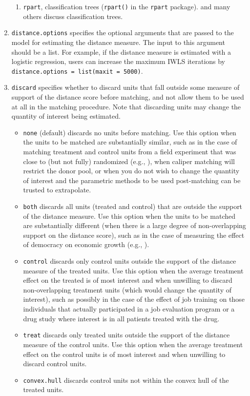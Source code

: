 \documentclass[oneside,letterpaper,titlepage]{article}
\begin{document}
\begin{enumerate}
\begin{enumerate}
  \item \texttt{rpart}, classification trees ({\tt rpart()} in the
    \texttt{rpart} package). \citet{BreFriOls84,RugKimMar03} and many
    others discuss classification trees.
  \end{enumerate}
  
\item \texttt{distance.options} specifies the optional arguments that
  are passed to the model for estimating the distance measure. The
  input to this argument should be a list.  For example, if the
  distance measure is estimated with a logistic regression, users can
  increase the maximum IWLS iterations by \texttt{distance.options =
    list(maxit = 5000)}.

\item \texttt{discard} specifies whether to discard units that fall
  outside some measure of support of the distance score before
  matching, and not allow them to be used at all in the matching
  procedure.  Note that discarding units may change the quantity of
  interest being estimated.
  \begin{itemize}
  \item \texttt{none} (default) discards no units before matching.
    Use this option when the units to be matched are substantially
    similar, such as in the case of matching treatment and control
    units from a field experiment that was close to (but not fully)
    randomized (e.g., \citealt{Imai05}), when caliper matching will
    restrict the donor pool, or when you do not wish to change the
    quantity of interest and the parametric methods to be used
    post-matching can be trusted to extrapolate.
   \item \texttt{both} discards all units (treated and control) that
     are outside the support of the distance measure. Use this option
     when the units to be matched are substantially different (when
     there is a large degree of non-overlapping support on the
     distance score), such as in the case of measuring the effect of
     democracy on economic growth (e.g., \citealt{KinZen04}).
   \item \texttt{control} discards only control units outside the
     support of the distance measure of the treated units.  Use this
     option when the average treatment effect on the treated is of
     most interest and when unwilling to discard non-overlapping
     treatment units (which would change the quantity of interest),
     such as possibly in the case of the effect of job training on
     those individuals that actually participated in a job evaluation
     program or a drug study where interest is in all patients treated
     with the drug.
   \item \texttt{treat} discards only treated units outside the
     support of the distance measure of the control units.  Use this
     option when the average treatment effect on the control units is
     of most interest and when unwilling to discard control units.
   \item \texttt{convex.hull} discards control units not within the
     convex hull of the treated units. 
  \end{itemize}
  

\end{enumerate}
\end{document}
